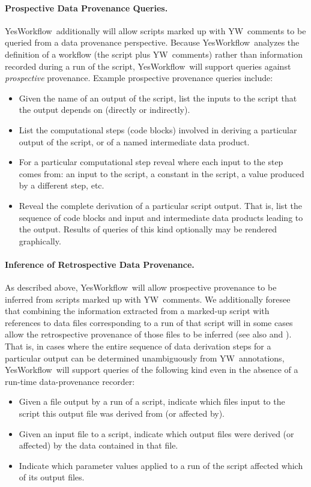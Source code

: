\documentclass{article}
\newcommand{\YW}{\textsf{YesWorkflow}}
\newcommand{\yw}{\textsf{YW}}
\begin{document}
\paragraph{Prospective Data Provenance Queries.}
\YW\ additionally will allow scripts
marked up with \yw\ comments to be queried from a data provenance
perspective. Because \YW\ analyzes the definition of a workflow (the
script plus \yw\ comments) rather than information recorded during a
run of the script,  \YW\ will support queries
against \emph{prospective} provenance.
%
Example prospective provenance queries include:
\begin{itemize}
\item Given the name of an output of the script, list the inputs to
  the script that the output depends on (directly or indirectly). 
\item List the computational steps (code blocks) involved in deriving
  a particular output of the script, or of a named intermediate data
  product. 
\item For a particular computational step reveal where each input to
  the step comes from: an input to the script, a constant in the
  script, a value produced by a different step, etc. 
\item Reveal the complete derivation of a particular script output.
  That is, list the sequence of code blocks and input and intermediate
  data products leading to the output. Results of queries of this kind
  optionally may be rendered graphically. 
\end{itemize}

\paragraph{Inference of Retrospective Data Provenance.}
As described above, \YW\ will allow prospective provenance to be
inferred from scripts marked up with \yw\ comments.  We additionally
foresee that combining the information extracted from a marked-up
script with references to data files corresponding to a run of that
script will in some cases allow the retrospective provenance of those files to be
inferred (see also \cite{Bowers2012Provenance} and
\cite{Zinn2010Abstract}). That is, in cases where the entire sequence of data
derivation steps for a particular output can be determined unambiguously from \yw\
annotations, \YW\ will support queries of the following kind even in the absence of a
run-time data-provenance recorder:
\begin{itemize} 
\item Given a file output by a run of a script, indicate which files
  input to the script this output file was derived  from (or affected
  by). 
\item Given an input file to a script, indicate which  output files
  were derived (or affected) by the data contained in that file.
\item Indicate which parameter values applied to a run of the
  script affected which of its output files. 
\end{itemize}
\end{document}
